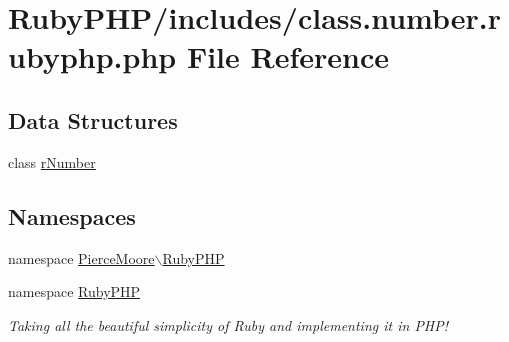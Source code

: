 \hypertarget{class_8number_8rubyphp_8php}{\section{Ruby\-P\-H\-P/includes/class.number.\-rubyphp.\-php File Reference}
\label{class_8number_8rubyphp_8php}
}
\subsection*{Data Structures}
\begin{DoxyCompactItemize}
\item 
class \hyperlink{class_pierce_moore_1_1_ruby_p_h_p_1_1r_number}{r\-Number}
\end{DoxyCompactItemize}
\subsection*{Namespaces}
\begin{DoxyCompactItemize}
\item 
namespace \hyperlink{namespace_pierce_moore_1_1_ruby_p_h_p}{Pierce\-Moore$\backslash$\-Ruby\-P\-H\-P}
\item 
namespace \hyperlink{namespace_ruby_p_h_p}{Ruby\-P\-H\-P}
\begin{DoxyCompactList}\small\item\em Taking all the beautiful simplicity of Ruby and implementing it in P\-H\-P! \end{DoxyCompactList}\end{DoxyCompactItemize}
